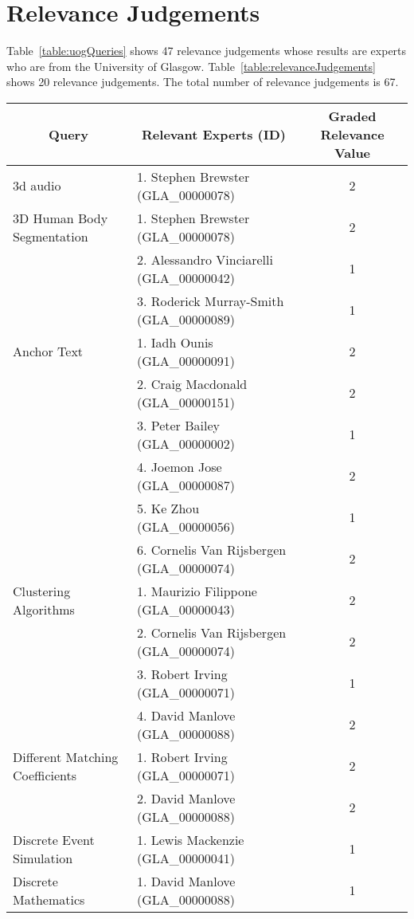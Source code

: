 \clearpage
\section{Relevance Judgements}
Table~\ref{table:uogQueries} shows 47 relevance judgements whose results are experts who are from the University of Glasgow.
Table~\ref{table:relevanceJudgements} shows 20 relevance judgements. The total number of relevance judgements is 67.

\footnotesize
\begin{longtable}{|l|l|c|}

\hline \multicolumn{1}{|c|}{\textbf{Query}} & \multicolumn{1}{|c|}{\textbf{Relevant Experts (ID)}} & \multicolumn{1}{|c|}{\textbf{Graded Relevance Value}} \\
\hline 3d audio & 1. Stephen Brewster (GLA\_00000078) & 2 \\
\hline 3D Human Body Segmentation & 1. Stephen Brewster (GLA\_00000078) & 2\\
\hline  & 2. Alessandro Vinciarelli (GLA\_00000042) & 1 \\
\hline  & 3. Roderick Murray-Smith (GLA\_00000089) & 1 \\  
\hline Anchor Text & 1. Iadh Ounis (GLA\_00000091) & 2 \\ 
\hline  & 2. Craig Macdonald (GLA\_00000151) & 2 \\ 
\hline  & 3. Peter Bailey (GLA\_00000002) & 1 \\ 
\hline  & 4. Joemon Jose (GLA\_00000087) & 2 \\ 
\hline  & 5. Ke Zhou (GLA\_00000056) & 1 \\ 
\hline  & 6. Cornelis Van Rijsbergen (GLA\_00000074) & 2 \\ 
\hline Clustering Algorithms & 1. Maurizio Filippone (GLA\_00000043) & 2 \\ 
\hline  & 2. Cornelis Van Rijsbergen (GLA\_00000074) & 2 \\ 
\hline  & 3. Robert Irving (GLA\_00000071) & 1 \\ 
\hline  & 4. David Manlove (GLA\_00000088) & 2 \\ 
\hline Different Matching Coefficients & 1. Robert Irving (GLA\_00000071) & 2 \\ 
\hline  & 2. David Manlove (GLA\_00000088) & 2 \\ 
\hline Discrete Event Simulation & 1. Lewis Mackenzie (GLA\_00000041) & 1 \\ 
\hline Discrete Mathematics & 1. David Manlove (GLA\_00000088) & 1 \\ 

\end{longtable}
